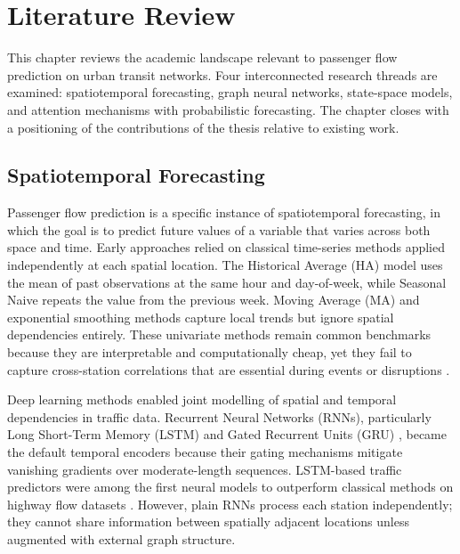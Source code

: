 %
%
\chapter{Literature Review}
\label{chap:litreview}
\setlength{\parskip}{1em}

This chapter reviews the academic landscape relevant to passenger flow prediction on urban transit networks. Four interconnected research threads are examined: spatiotemporal forecasting, graph neural networks, state-space models, and attention mechanisms with probabilistic forecasting. The chapter closes with a positioning of the contributions of the thesis relative to existing work.

\section{Spatiotemporal Forecasting}
\label{sec:spatiotemporal}

Passenger flow prediction is a specific instance of spatiotemporal forecasting, in which the goal is to predict future values of a variable that varies across both space and time. Early approaches relied on classical time-series methods applied independently at each spatial location. The Historical Average (HA) model uses the mean of past observations at the same hour and day-of-week, while Seasonal Naive repeats the value from the previous week. Moving Average (MA) and exponential smoothing methods capture local trends but ignore spatial dependencies entirely. These univariate methods remain common benchmarks because they are interpretable and computationally cheap, yet they fail to capture cross-station correlations that are essential during events or disruptions \cite{vlahogianni2014short,li2016brief}.

Deep learning methods enabled joint modelling of spatial and temporal dependencies in traffic data. Recurrent Neural Networks (RNNs), particularly Long Short-Term Memory (LSTM) \cite{hochreiter1997long} and Gated Recurrent Units (GRU) \cite{cho2014rnnencoder}, became the default temporal encoders because their gating mechanisms mitigate vanishing gradients over moderate-length sequences. LSTM-based traffic predictors were among the first neural models to outperform classical methods on highway flow datasets \cite{ma2015long}. However, plain RNNs process each station independently; they cannot share information between spatially adjacent locations unless augmented with external graph structure.

